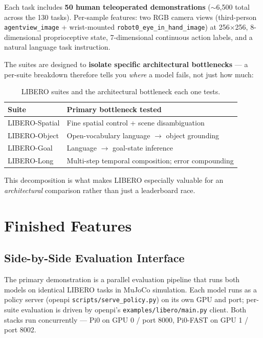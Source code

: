 \documentclass[11pt,letterpaper]{article}
\begin{document}
Each task includes \textbf{50 human teleoperated demonstrations} ($\sim$6{,}500 total across the 130 tasks). Per-sample features: two RGB camera views (third-person \texttt{agentview\_image} + wrist-mounted \texttt{robot0\_eye\_in\_hand\_image}) at 256$\times$256, 8-dimensional proprioceptive state, 7-dimensional continuous action labels, and a natural language task instruction.

The suites are designed to \textbf{isolate specific architectural bottlenecks} --- a per-suite breakdown therefore tells you \emph{where} a model fails, not just how much:

\begin{table}[h]
\centering
\small
\caption{LIBERO suites and the architectural bottleneck each one tests.}
\begin{tabular}{ll}
\toprule
\textbf{Suite} & \textbf{Primary bottleneck tested} \\
\midrule
LIBERO-Spatial & Fine spatial control + scene disambiguation \\
LIBERO-Object & Open-vocabulary language $\to$ object grounding \\
LIBERO-Goal & Language $\to$ goal-state inference \\
LIBERO-Long & Multi-step temporal composition; error compounding \\
\bottomrule
\end{tabular}
\end{table}

This decomposition is what makes LIBERO especially valuable for an \emph{architectural} comparison rather than just a leaderboard race.

\section{Finished Features}

\subsection*{Side-by-Side Evaluation Interface}

The primary demonstration is a parallel evaluation pipeline that runs both models on identical LIBERO tasks in MuJoCo simulation. Each model runs as a policy server (openpi \texttt{scripts/serve\_policy.py}) on its own GPU and port; per-suite evaluation is driven by openpi's \texttt{examples/libero/main.py} client. Both stacks run concurrently --- Pi0 on GPU 0 / port 8000, Pi0-FAST on GPU 1 / port 8002.
\end{document}
